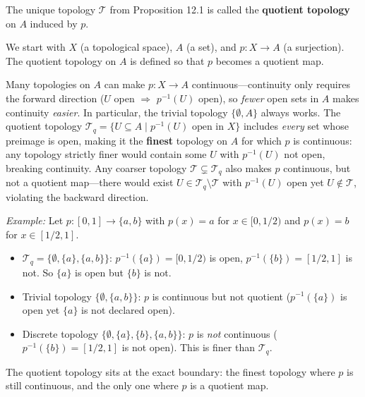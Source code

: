 \documentclass[11pt]{report}
\begin{document}
\begin{defbox}
The unique topology $\mathcal{T}$ from Proposition 12.1 is called the \textbf{quotient topology} on $A$ induced by $p$.
\end{defbox}

\begin{rembox}
We start with $X$ (a topological space), $A$ (a set), and $p: X \to A$ (a surjection). The quotient topology on $A$ is defined so that $p$ becomes a quotient map.
\end{rembox}

\begin{rembox}
Many topologies on $A$ can make $p: X \to A$ continuous---continuity only requires the forward direction ($U$ open $\Rightarrow$ $p^{-1}(U)$ open), so \emph{fewer} open sets in $A$ makes continuity \emph{easier}. In particular, the trivial topology $\{\emptyset, A\}$ always works. The quotient topology $\mathcal{T}_q = \{U \subseteq A \mid p^{-1}(U) \text{ open in } X\}$ includes \emph{every} set whose preimage is open, making it the \textbf{finest} topology on $A$ for which $p$ is continuous: any topology strictly finer would contain some $U$ with $p^{-1}(U)$ not open, breaking continuity. Any coarser topology $\mathcal{T} \subsetneq \mathcal{T}_q$ also makes $p$ continuous, but not a quotient map---there would exist $U \in \mathcal{T}_q \setminus \mathcal{T}$ with $p^{-1}(U)$ open yet $U \notin \mathcal{T}$, violating the backward direction.

\textit{Example:} Let $p: [0,1] \to \{a, b\}$ with $p(x) = a$ for $x \in [0, 1/2)$ and $p(x) = b$ for $x \in [1/2, 1]$.
\begin{itemize}
    \item $\mathcal{T}_q = \{\emptyset, \{a\}, \{a,b\}\}$: $p^{-1}(\{a\}) = [0, 1/2)$ is open, $p^{-1}(\{b\}) = [1/2, 1]$ is not. So $\{a\}$ is open but $\{b\}$ is not.
    \item Trivial topology $\{\emptyset, \{a,b\}\}$: $p$ is continuous but not quotient ($p^{-1}(\{a\})$ is open yet $\{a\}$ is not declared open).
    \item Discrete topology $\{\emptyset, \{a\}, \{b\}, \{a,b\}\}$: $p$ is \emph{not} continuous ($p^{-1}(\{b\}) = [1/2, 1]$ is not open). This is finer than $\mathcal{T}_q$.
\end{itemize}
The quotient topology sits at the exact boundary: the finest topology where $p$ is still continuous, and the only one where $p$ is a quotient map.
\end{rembox}
\end{document}
